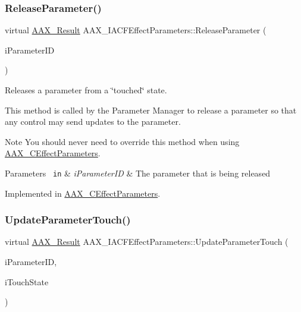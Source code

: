 \subsubsection{\texorpdfstring{ReleaseParameter()}{ReleaseParameter()}}
{\footnotesize\ttfamily virtual \mbox{\hyperlink{a00392_a4d8f69a697df7f70c3a8e9b8ee130d2f}{A\+A\+X\+\_\+\+Result}} A\+A\+X\+\_\+\+I\+A\+C\+F\+Effect\+Parameters\+::\+Release\+Parameter (\begin{DoxyParamCaption}\item[{\mbox{\hyperlink{a00392_a1440c756fe5cb158b78193b2fc1780d1}{A\+A\+X\+\_\+\+C\+Param\+ID}}}]{i\+Parameter\+ID }\end{DoxyParamCaption})\hspace{0.3cm}{\ttfamily [pure virtual]}}



Releases a parameter from a \char`\"{}touched\char`\"{} state. 

This method is called by the Parameter Manager to release a parameter so that any control may send updates to the parameter.

\begin{DoxyNote}{Note}
You should never need to override this method when using \mbox{\hyperlink{a01481}{A\+A\+X\+\_\+\+C\+Effect\+Parameters}}.
\end{DoxyNote}

\begin{DoxyParams}[1]{Parameters}
\mbox{\texttt{ in}}  & {\em i\+Parameter\+ID} & The parameter that is being released \\
\hline
\end{DoxyParams}


Implemented in \mbox{\hyperlink{a01481_a39c2085d444916000acec5da3797ca37}{A\+A\+X\+\_\+\+C\+Effect\+Parameters}}.

\mbox{\label{a01669_a93483f44315bdf3adf60bf5bf773fbb8}} 
\subsubsection{\texorpdfstring{UpdateParameterTouch()}{UpdateParameterTouch()}}
{\footnotesize\ttfamily virtual \mbox{\hyperlink{a00392_a4d8f69a697df7f70c3a8e9b8ee130d2f}{A\+A\+X\+\_\+\+Result}} A\+A\+X\+\_\+\+I\+A\+C\+F\+Effect\+Parameters\+::\+Update\+Parameter\+Touch (\begin{DoxyParamCaption}\item[{\mbox{\hyperlink{a00392_a1440c756fe5cb158b78193b2fc1780d1}{A\+A\+X\+\_\+\+C\+Param\+ID}}}]{i\+Parameter\+ID,  }\item[{\mbox{\hyperlink{a00392_aa216506530f1d19a2965931ced2b274b}{A\+A\+X\+\_\+\+C\+Boolean}}}]{i\+Touch\+State }\end{DoxyParamCaption})\hspace{0.3cm}{\ttfamily [pure virtual]}}



